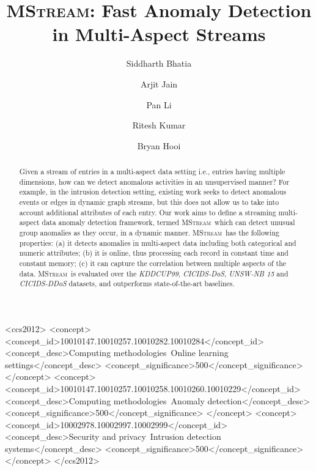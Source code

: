 \documentclass[sigconf]{acmart}
\newcommand{\method}{\textsc{MStream}}
\begin{document}
\title{\method: Fast Anomaly Detection in Multi-Aspect Streams}

\author{Siddharth Bhatia}



\author{Arjit Jain}

\author{Pan Li}


\author{Ritesh Kumar}


\author{Bryan Hooi}



\begin{abstract}
  Given a stream of entries in a multi-aspect data setting i.e., entries having multiple dimensions, how can we detect anomalous activities in an unsupervised manner? For example, in the intrusion detection setting, existing work seeks to detect anomalous events or edges in dynamic graph streams, but this does not allow us to take into account additional attributes of each entry. Our work aims to define a streaming multi-aspect data anomaly detection framework, termed \method\, which can detect unusual group anomalies as they occur, in a dynamic manner. \method\ has the following properties: (a) it detects anomalies in multi-aspect data including both categorical and numeric attributes; (b) it is online, thus processing each record in constant time and constant memory; (c) it can capture the correlation between multiple aspects of the data. \method\ is evaluated over the \emph{KDDCUP99}, \emph{CICIDS-DoS}, \emph{UNSW-NB 15} and \emph{CICIDS-DDoS} datasets, and outperforms state-of-the-art baselines.
\end{abstract}

\begin{CCSXML}
<ccs2012>
<concept>
<concept_id>10010147.10010257.10010282.10010284</concept_id>
<concept_desc>Computing methodologies~Online learning settings</concept_desc>
<concept_significance>500</concept_significance>
</concept>
<concept>
<concept_id>10010147.10010257.10010258.10010260.10010229</concept_id>
<concept_desc>Computing methodologies~Anomaly detection</concept_desc>
<concept_significance>500</concept_significance>
</concept>
<concept>
<concept_id>10002978.10002997.10002999</concept_id>
<concept_desc>Security and privacy~Intrusion detection systems</concept_desc>
<concept_significance>500</concept_significance>
</concept>
</ccs2012>
\end{CCSXML}
\end{document}
